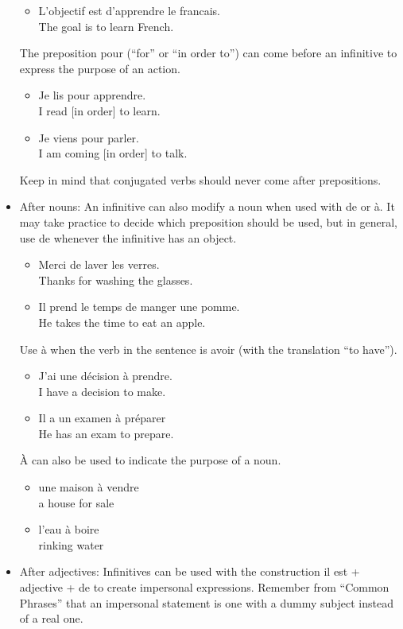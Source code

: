 \begin{itemize}
\begin{itemize}
       \item  L'objectif est d'apprendre le francais. \\ The goal is to learn French.
    \end{itemize}
    The preposition pour (``for'' or ``in order to'') can come before an infinitive to express the purpose of an action.
    \begin{itemize}
       \item  Je lis pour apprendre. \\ I read [in order] to learn.
       \item  Je viens pour parler. \\ I am coming [in order] to talk.
    \end{itemize}
    Keep in mind that conjugated verbs should never come after prepositions.
  \item  After nouns:  An infinitive can also modify a noun when used with de or {\`a}. It may take practice to decide which preposition should be used, but in general, use de whenever the infinitive has an object.
    \begin{itemize}
       \item  Merci de laver les verres. \\ Thanks for washing the glasses.
       \item  Il prend le temps de manger une pomme. \\ He takes the time to eat an apple.
    \end{itemize}
    Use {\`a} when the verb in the sentence is avoir (with the translation ``to have'').
    \begin{itemize}
       \item  J'ai une d{\'e}cision {\`a} prendre. \\ I have a decision to make.
       \item  Il a un examen {\`a} pr{\'e}parer \\ He has an exam to prepare.
    \end{itemize}
    {\`A} can also be used to indicate the purpose of a noun.
    \begin{itemize}
       \item  une maison {\`a} vendre \\ a house for sale
       \item  l'eau {\`a} boire \\ rinking water
    \end{itemize}
  \item  After adjectives:  Infinitives can be used with the construction il est + adjective + de to create impersonal expressions. Remember from ``Common Phrases'' that an impersonal statement is one with a dummy subject instead of a real one.

\end{itemize}
